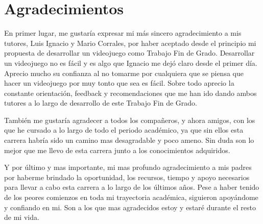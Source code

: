 \chapter*{Agradecimientos}

En primer lugar, me gustaría expresar mi más sincero agradecimiento a mis tutores, Luis Ignacio y Mario Corrales, por haber aceptado desde el principio mi propuesta de desarrollar un videojuego como Trabajo Fin de Grado. Desarrollar un videojuego no es fácil y es algo que Ignacio me dejó claro desde el primer día. Aprecio mucho su confianza al no tomarme por cualquiera que se piensa que hacer un videojuego por muy tonto que sea es fácil. Sobre todo aprecio la constante orientación, feedback y recomendaciones que me han ido dando ambos tutores a lo largo de desarrollo de este Trabajo Fin de Grado.

También me gustaría agradecer a todos los compañeros, y ahora amigos, con los que he cursado a lo largo de todo el periodo académico, ya que sin ellos esta carrera habría sido un camino mas desagradable y poco ameno. Sin duda son lo mejor que me llevo de esta carrera junto a los conocimientos adquiridos.

Y por último y mas importante, mi mas profundo agradecimiento a mis padres por haberme brindado la oportunidad, los recursos, tiempo y apoyo necesarios para llevar a cabo esta carrera a lo largo de los últimos años. Pese a haber tenido de los peores comienzos en toda mi trayectoria académica, siguieron apoyándome y confiando en mi. Son a los que mas agradecidos estoy y estaré durante el resto de mi vida.